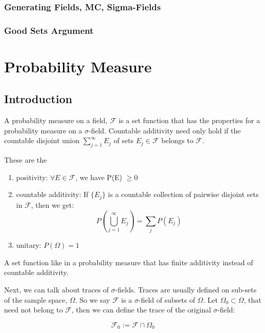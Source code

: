 \documentclass{article}
\theoremstyle{proposition}
\begin{document}
			\subsubsection{Generating Fields, MC, Sigma-Fields}


			\subsubsection{Good Sets Argument}
\section{Probability Measure}
	\subsection{Introduction}
		\begin{definition}
		A probability measure on a field, $\mathcal{F}$ is a set function that has the properties for a probability measure on a $\sigma$-field. Countable additivity need only hold if the countable disjoint union $\sum_{j=1}^\infty E_j$ of sets $E_j \in \mathcal{F}$ belongs to $\mathcal{F}$.


		These are the
			\begin{enumerate}
				\item positivity: $\forall E \in \mathcal{F}$, we have P(E) $\ge 0$
				\item countable additivity: If $\{E_j\}$ is a countable collection of pairwise disjoint sets in $\mathcal{F}$, then we get: 
					$$P(\bigcup_{j=1}^\infty E_j) = \sum_j P(E_j)$$
				\item unitary: $P(\Omega) = 1$
			\end{enumerate}
		\end{definition}

		\begin{definition}
			A set function like in a probability measure that has finite additivity instead of countable additivity.
		\end{definition}

		Next, we can talk about traces of $\sigma$-fields. Traces are usually defined on sub-sets of the sample space, $\Omega$. So we say $\mathcal{F}$ is a $\sigma$-field of subsets of $\Omega$. Let $\Omega_0 \subset \Omega$, that need not belong to $\mathcal{F}$, then we can define the trace of the original $\sigma$-field:

			$$\mathcal{F}_0 := \mathcal{F} \cap \Omega_0$$
\end{document}
